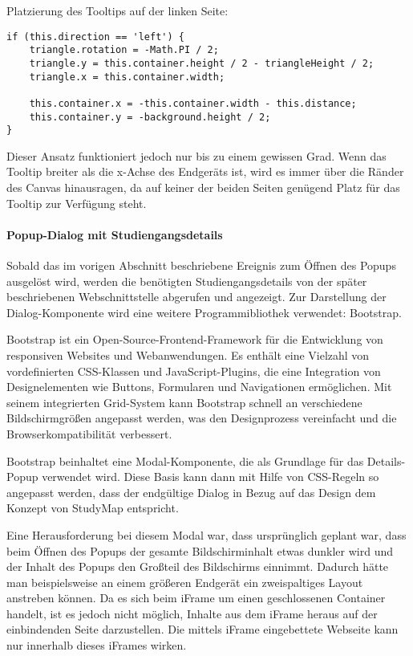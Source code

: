 \noindent
Platzierung des Tooltips auf der linken Seite:
\begin{lstlisting}[style=Python]
if (this.direction == 'left') {
    triangle.rotation = -Math.PI / 2;
    triangle.y = this.container.height / 2 - triangleHeight / 2;
    triangle.x = this.container.width;

    this.container.x = -this.container.width - this.distance;
    this.container.y = -background.height / 2;
}
\end{lstlisting}

Dieser Ansatz funktioniert jedoch nur bis zu einem gewissen Grad. Wenn das Tooltip breiter als die x-Achse des Endgeräts ist, wird es immer über die Ränder des Canvas hinausragen, da auf keiner der beiden Seiten genügend Platz für das Tooltip zur Verfügung steht. %

\paragraph*{Popup-Dialog mit Studiengangsdetails}
Sobald das im vorigen Abschnitt beschriebene Ereignis zum Öffnen des Popups ausgelöst wird, werden die benötigten Studiengangsdetails von der später beschriebenen Webschnittstelle abgerufen und angezeigt. Zur Darstellung der Dialog-Komponente wird eine weitere Programmibliothek verwendet: Bootstrap.

Bootstrap ist ein Open-Source-Frontend-Framework für die Entwicklung von responsiven Websites und Webanwendungen. Es enthält eine Vielzahl von vordefinierten CSS-Klassen und JavaScript-Plugins, die eine Integration von Designelementen wie Buttons, Formularen und Navigationen ermöglichen. \parencite{otto_bootstrap_2024} Mit seinem integrierten Grid-System kann Bootstrap schnell an verschiedene Bildschirmgrößen angepasst werden, was den Designprozess vereinfacht und die Browserkompatibilität verbessert. \parencite{otto_browsers_2024}

Bootstrap beinhaltet eine Modal-Komponente, die als Grundlage für das Details-Popup verwendet wird. \parencite{otto_modal_2024} Diese Basis kann dann mit Hilfe von CSS-Regeln so angepasst werden, dass der endgültige Dialog in Bezug auf das Design dem Konzept von StudyMap entspricht.

Eine Herausforderung bei diesem Modal war, dass ursprünglich geplant war, dass beim Öffnen des Popups der gesamte Bildschirminhalt etwas dunkler wird und der Inhalt des Popups den Großteil des Bildschirms einnimmt. Dadurch hätte man beispielsweise an einem größeren Endgerät ein zweispaltiges Layout anstreben können. Da es sich beim iFrame um einen geschlossenen Container handelt, ist es jedoch nicht möglich, Inhalte aus dem iFrame heraus auf der einbindenden Seite darzustellen. Die mittels iFrame eingebettete Webseite kann nur innerhalb dieses iFrames wirken. %

